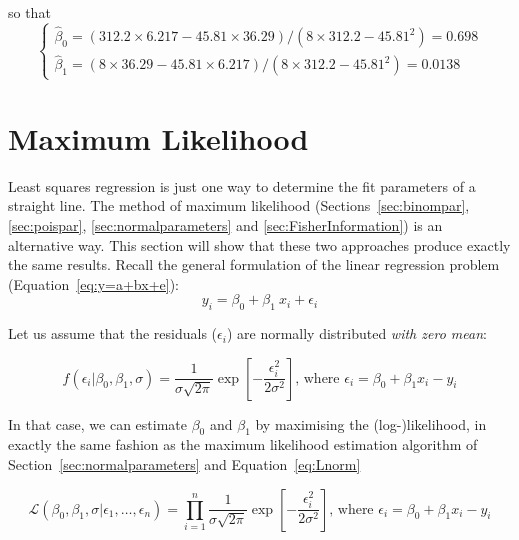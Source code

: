 \noindent so that
\begin{equation*}
\begin{cases}
  \hat{\beta}_0 = \left(312.2 \times 6.217 - 45.81 \times 36.29 \right) /
  \left(8 \times 312.2 - 45.81^2\right) = 0.698 \\
  \hat{\beta}_1 = \left( 8 \times 36.29 - 45.81 \times 6.217 \right) /
  \left(8 \times 312.2 - 45.81^2\right) = 0.0138
\end{cases}
\end{equation*}

\section{Maximum Likelihood}
\label{sec:MLregression}

Least squares regression is just one way to determine the fit
parameters of a straight line.  The method of maximum likelihood
(Sections~\ref{sec:binompar}, \ref{sec:poispar},
\ref{sec:normalparameters} and \ref{sec:FisherInformation}) is an
alternative way. This section will show that these two approaches
produce exactly the same results. Recall the general formulation of
the linear regression problem (Equation~\ref{eq:y=a+bx+e}):
\begin{equation*}
  y_i = \beta_0 + \beta_1~x_i + \epsilon_i
\end{equation*}

Let us assume that the residuals ($\epsilon_i$) are normally
distributed \emph{with zero mean}:

\begin{equation}
  f(\epsilon_i|\beta_0,\beta_1,\sigma) = \frac{1}{\sigma\sqrt{2\pi}}
  \exp\!\left[-\frac{\epsilon_i^2}{2\sigma^2}\right] \mbox{,~where~}
  \epsilon_i = \beta_0 + \beta_1 x_i - y_i
  \label{eq:normalresid}
\end{equation}

In that case, we can estimate $\beta_0$ and $\beta_1$ by maximising
the (log-)likelihood, in exactly the same fashion as the maximum
likelihood estimation algorithm of Section~\ref{sec:normalparameters}
and Equation~\ref{eq:Lnorm}

\begin{equation}
  \mathcal{L}(\beta_0,\beta_1,\sigma|\epsilon_1,\ldots,\epsilon_n) =
  \prod\limits_{i=1}^{n}\frac{1}{\sigma\sqrt{2\pi}}
  \exp\!\left[-\frac{\epsilon_i^2}{2\sigma^2}\right] \mbox{,~where~}
  \epsilon_i = \beta_0 + \beta_1 x_i - y_i
  \label{eq:Lregression}
\end{equation}

